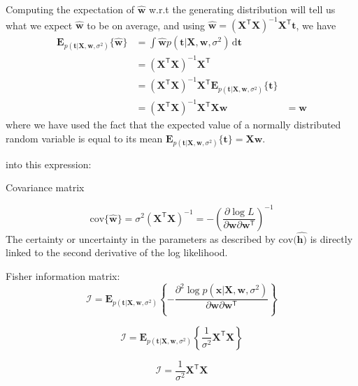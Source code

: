 \documentclass[a4paper,11pt]{article} %
\begin{document}
Computing the expectation of $\widehat{\mathbf{w}}$ w.r.t the generating distribution will tell us
what we expect $\widehat{\mathbf{w}}$ to be on average, and using
$\widehat{\mathbf{w}} = (\mathbf{X}^{\mathsf{T}}\mathbf{X})^{-1}\mathbf{X}^{\mathsf{T}}\mathbf{t}$,
we have
\begin{align*}
\mathbf{E}_{p(\mathbf{t}|\mathbf{X},\mathbf{w},\sigma^2)}\{\widehat{\mathbf{w}}\} & =
\int \widehat{\mathbf{w}} p(\mathbf{t}|\mathbf{X},\mathbf{w},\sigma^2)\,\mathrm{d}\mathbf{t} \\
& = (\mathbf{X}^{\mathsf{T}}\mathbf{X})^{-1}\mathbf{X}^{\mathsf{T}} \\
& = (\mathbf{X}^{\mathsf{T}}\mathbf{X})^{-1}\mathbf{X}^{\mathsf{T}} 
\mathbf{E}_{p(\mathbf{t}|\mathbf{X},\mathbf{w},\sigma^2)}\{\mathbf{t}\} \\
& = (\mathbf{X}^{\mathsf{T}}\mathbf{X})^{-1}\mathbf{X}^{\mathsf{T}}\mathbf{X}\mathbf{w}
& = \mathbf{w}
\end{align*}
where we have used the fact that the expected value of a normally distributed random
variable is equal to its mean
$\mathbf{E}_{p(\mathbf{t}|\mathbf{X},\mathbf{w},\sigma^2)}\{\mathbf{t}\} =
\mathbf{X}\mathbf{w}$.


into this expression:


Covariance matrix

\begin{equation}
\mathrm{cov}\{\widehat{\mathbf{w}}\} = \sigma^2 (\mathbf{X}^{\mathsf{T}}\mathbf{X})^{-1} =
-\left( \frac{\partial\log L}{\partial\mathbf{w}\partial\mathbf{w}^{\mathsf{T}}} \right)^{-1}
\end{equation}
The certainty or uncertainty in the parameters as described by $\mathrm{cov}(\widehat{\mathbf{h})}$
is directly linked to the second derivative of the log likelihood.

Fisher information matrix:
\begin{equation}
\mathcal{I} = \mathbf{E}_{p(\mathbf{t}|\mathbf{X},\mathbf{w},\sigma^2)}
\left\{ -\frac{\partial^2\log p(\mathbf{x}|\mathbf{X},\mathbf{w},\sigma^2)}{\partial\mathbf{w}\partial\mathbf{w}^{\mathsf{T}}}
\right\}
\end{equation}

\begin{equation}
\mathcal{I} = \mathbf{E}_{p(\mathbf{t}|\mathbf{X},\mathbf{w},\sigma^2)}
\left\{ \frac{1}{\sigma^2} \mathbf{X}^{\mathsf{T}}\mathbf{X}
\right\}
\end{equation}

\begin{equation}
\mathcal{I} = \frac{1}{\sigma^2} \mathbf{X}^{\mathsf{T}}\mathbf{X}
\end{equation}
\end{document}
